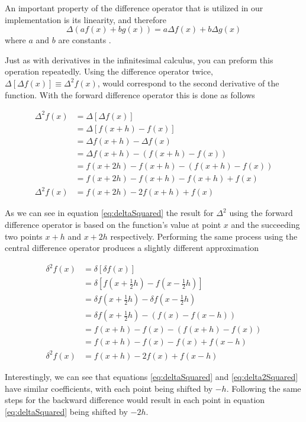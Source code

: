 \documentclass[authoryearcitations]{UoYCSproject}
\begin{document}
An important property of the difference operator that is utilized in our implementation is its linearity,
 and therefore
$$\Delta (af(x) + bg(x)) = a \Delta f(x) + b\Delta g(x) $$
where $a$ and $b$ are constants \cite{Hamming}. 

Just as with derivatives in the infinitesimal calculus, you can preform this operation repeatedly. Using the difference
operator twice, $\Delta [\Delta f(x) ] \equiv \Delta ^2 f(x) $, would correspond to the second derivative of the function. 
With the forward difference operator this is done as follows

\begin{align}
 \Delta ^2 f(x)&= \Delta [\Delta f(x)]  \nonumber\\
		&= \Delta [f(x + h) - f(x)] \nonumber\\
		&= \Delta f(x + h) - \Delta f(x) \nonumber\\  
		&= \Delta f(x + h) - (f(x + h) - f(x)) \nonumber \\
		&= f(x + 2h) - f(x + h) - (f(x + h) - f(x)) \nonumber \\ 
		&= f(x + 2h) - f(x + h) - f(x + h) + f(x) \nonumber \\
 \Delta ^2 f(x)	&= f(x + 2h) - 2f(x + h) + f(x) \label{eq:deltaSquared}
\end{align}

As we can see in equation \ref{eq:deltaSquared} the result for $\Delta ^2$ using the forward difference operator is based 
on the function's value at point $x$ and the succeeding two points $x+h$ and $x+2h$ respectively. Performing the same 
process using the central difference operator produces a slightly different approximation

\begin{align}
 \delta ^2 f(x)&= \delta [\delta f(x)]  \nonumber\\
		&= \delta [f(x + \frac{1}{2}h) - f(x - \frac{1}{2}h)] \nonumber\\
		&= \delta f(x + \frac{1}{2}h) - \delta f(x - \frac{1}{2}h) \nonumber\\  
		&= \delta f(x + \frac{1}{2}h) - (f(x) - f(x - h)) \nonumber \\
		&= f(x + h) - f(x) - (f(x + h) - f(x)) \nonumber \\ 
		&= f(x + h) - f(x) - f(x) + f(x - h) \nonumber \\
 \delta ^2 f(x)	&= f(x + h) - 2f(x) + f(x - h)\label{eq:delta2Squared}
\end{align}


Interestingly, we can see that equations \ref{eq:deltaSquared} and \ref{eq:delta2Squared} have similar coefficients,
with each point being shifted by $-h$. Following the same steps for the backward difference would result in each point
in equation \ref{eq:deltaSquared} being shifted by $-2h$. 
\end{document}

